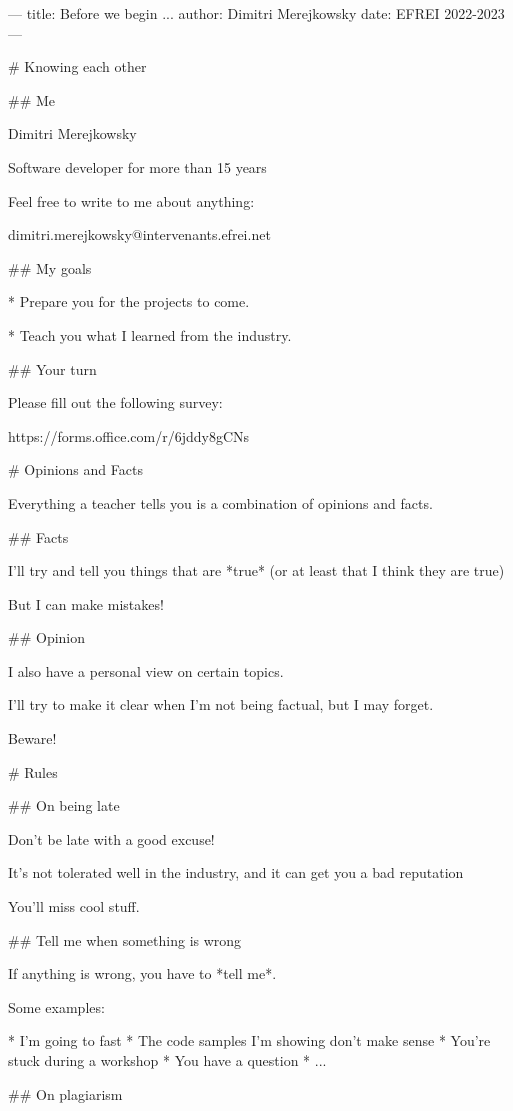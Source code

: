 ---
title: Before we begin ...
author: Dimitri Merejkowsky
date: EFREI 2022-2023
---

# Knowing each other

## Me

Dimitri Merejkowsky

\vfill

Software developer for more than 15 years

\vfill

Feel free to write to me about anything:

dimitri.merejkowsky@intervenants.efrei.net

## My goals

* Prepare you for the projects to come.

* Teach you what I learned from the industry.

## Your turn

Please fill out the following survey:

https://forms.office.com/r/6jddy8gCNs

# Opinions and Facts

Everything a teacher tells you is a combination of opinions and facts.

## Facts

I'll try and tell you things that are *true* (or at least that I think they are true)

But I can make mistakes!

## Opinion

I also have a personal view on certain topics.

I'll try to make it clear when I'm not being factual, but I may forget.

Beware!

# Rules

## On being late

Don't be late with a good excuse!

It's not tolerated well in the industry, and
it can get you a bad reputation

You'll miss cool stuff.

## Tell me when something is wrong

If anything is wrong, you have to *tell me*.

Some examples:

* I'm going to fast
* The code samples I'm showing don't make sense
* You're stuck during a workshop
* You have a question
* ...

## On plagiarism

